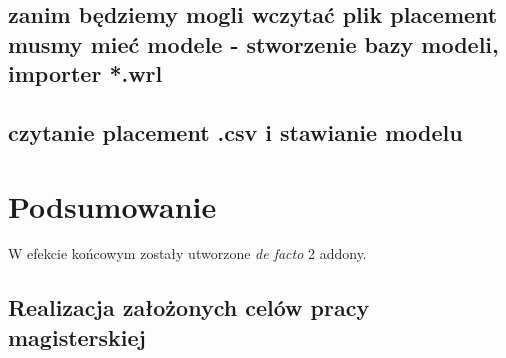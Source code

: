 \documentclass[brudnopis]{xmgr}
\begin{document}
\section {zanim będziemy mogli wczytać plik placement musmy mieć modele - stworzenie bazy modeli, importer *.wrl\label{wrl}}
\section {czytanie placement .csv i stawianie modelu}


\chapter{Podsumowanie}


W efekcie końcowym zostały utworzone \emph{de facto} 2 addony.

\section{Realizacja założonych celów pracy magisterskiej}
\end{document}
